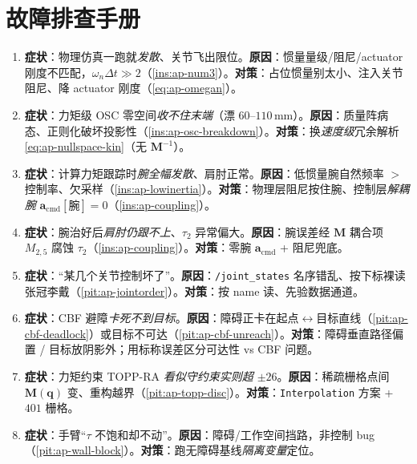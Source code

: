 \section*{故障排查手册}
\begin{enumerate}
  \item \textbf{症状}：物理仿真一跑就\emph{发散}、关节飞出限位。\textbf{原因}：惯量量级/阻尼/actuator 刚度不匹配，$\omega_n\Delta t\gg2$（\cref{ins:ap-num3}）。\textbf{对策}：占位惯量别太小、注入关节阻尼、降 actuator 刚度（\cref{eq:ap-omegan}）。
  \item \textbf{症状}：力矩级 OSC 零空间\emph{收不住末端}（漂 $60$--$110\,\mathrm{mm}$）。\textbf{原因}：质量阵病态、正则化破坏投影性（\cref{ins:ap-osc-breakdown}）。\textbf{对策}：换\emph{速度级}冗余解析 \cref{eq:ap-nullspace-kin}（无 $\mathbf{M}^{-1}$）。
  \item \textbf{症状}：计算力矩跟踪时\emph{腕全幅发散}、肩肘正常。\textbf{原因}：低惯量腕自然频率 $>$ 控制率、欠采样（\cref{ins:ap-lowinertia}）。\textbf{对策}：物理层阻尼按住腕、控制层\emph{解耦腕} $\mathbf{a}_{\mathrm{cmd}}[\text{腕}]=0$（\cref{ins:ap-coupling}）。
  \item \textbf{症状}：腕治好后\emph{肩肘仍跟不上}、$\tau_2$ 异常偏大。\textbf{原因}：腕误差经 $\mathbf{M}$ 耦合项 $M_{2,5}$ 腐蚀 $\tau_2$（\cref{ins:ap-coupling}）。\textbf{对策}：零腕 $\mathbf{a}_{\mathrm{cmd}}$ + 阻尼兜底。
  \item \textbf{症状}：“某几个关节控制坏了”。\textbf{原因}：\texttt{/joint\_states} 名序错乱、按下标裸读张冠李戴（\cref{pit:ap-jointorder}）。\textbf{对策}：按 name 读、先验数据通道。
  \item \textbf{症状}：CBF 避障\emph{卡死不到目标}。\textbf{原因}：障碍正卡在起点$\leftrightarrow$目标直线（\cref{pit:ap-cbf-deadlock}）或目标不可达（\cref{pit:ap-cbf-unreach}）。\textbf{对策}：障碍垂直路径偏置 / 目标放阴影外；用标称误差区分可达性 vs CBF 问题。
  \item \textbf{症状}：力矩约束 TOPP-RA \emph{看似守约束实则超 $\pm26$}。\textbf{原因}：稀疏栅格点间 $\mathbf{M}(\mathbf{q})$ 变、重构越界（\cref{pit:ap-topp-disc}）。\textbf{对策}：\texttt{Interpolation} 方案 + $401$ 栅格。
  \item \textbf{症状}：手臂“$\tau$ 不饱和却不动”。\textbf{原因}：障碍/工作空间挡路，非控制 bug（\cref{pit:ap-wall-block}）。\textbf{对策}：跑无障碍基线\emph{隔离变量}定位。
\end{enumerate}
